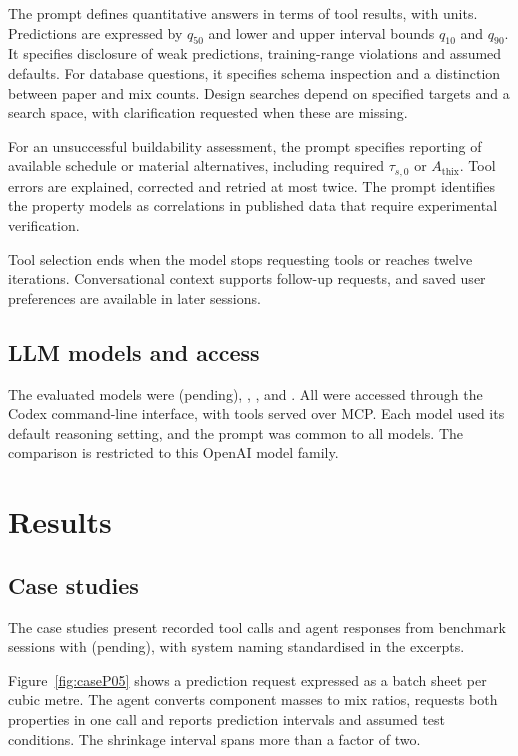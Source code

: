 \documentclass[preprint,12pt]{elsarticle}
\providecommand{\nbenchCxModel}{(pending)}
\begin{document}
The prompt defines quantitative answers in terms of tool results, with units. Predictions are expressed by $q_{50}$ and lower and upper interval bounds $q_{10}$ and $q_{90}$. It specifies disclosure of weak predictions, training-range violations and assumed defaults. For database questions, it specifies schema inspection and a distinction between paper and mix counts. Design searches depend on specified targets and a search space, with clarification requested when these are missing.

For an unsuccessful buildability assessment, the prompt specifies reporting of available schedule or material alternatives, including required $\tau_{s,0}$ or $A_{\mathrm{thix}}$. Tool errors are explained, corrected and retried at most twice. The prompt identifies the property models as correlations in published data that require experimental verification.

Tool selection ends when the model stops requesting tools or reaches twelve iterations. Conversational context supports follow-up requests, and saved user preferences are available in later sessions.

\subsection{LLM models and access}

The evaluated models were \nbenchCxModel{}, \nbenchCsModel{}, \nbenchCuModel{}, \nbenchCvModel{} and \nbenchCwModel{}. All were accessed through the Codex command-line interface, with tools served over MCP. Each model used its default reasoning setting, and the prompt was common to all models. The comparison is restricted to this OpenAI model family.

\section{Results}\label{sec:results}

\subsection{Case studies}\label{sec:cases}

The case studies present recorded tool calls and agent responses from benchmark sessions with \nbenchCxModel{}, with system naming standardised in the excerpts.

Figure~\ref{fig:caseP05} shows a prediction request expressed as a batch sheet per cubic metre. The agent converts component masses to mix ratios, requests both properties in one call and reports prediction intervals and assumed test conditions. The shrinkage interval spans more than a factor of two.
\end{document}
